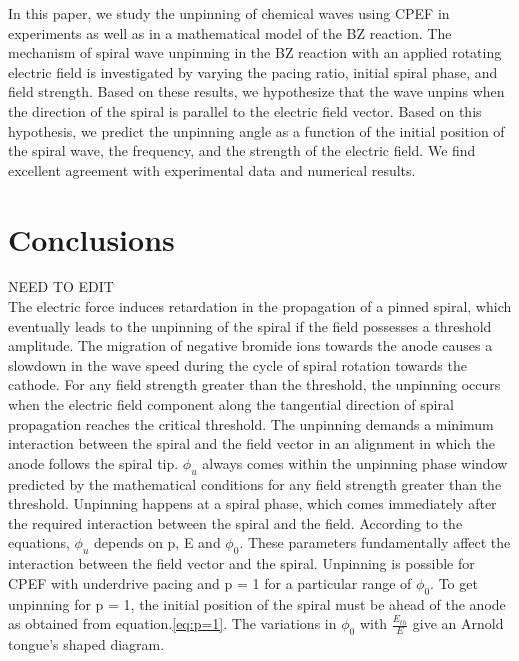 \documentclass[%
 reprint,
 amsmath,amssymb,
 aps,
prb,
]{revtex4-2}
\begin{document}
In this paper, we study the unpinning of chemical waves using CPEF in
experiments as well as in a mathematical model of the BZ reaction. The
mechanism of spiral wave unpinning in the BZ reaction with an applied rotating
electric field is investigated by varying the pacing ratio, initial spiral
phase, and field strength. Based on these results, we hypothesize that the wave
unpins when the direction of the spiral is parallel to the electric field
vector. Based on this hypothesis, we predict the unpinning angle as a function
of the initial position of the spiral wave, the frequency, and the strength of
the electric field. We find excellent agreement with experimental data and
numerical results.  
 


\section{Conclusions}
	NEED TO EDIT\\

The electric force induces retardation in the propagation of a pinned spiral, which eventually leads to the unpinning of the spiral if the field possesses a threshold amplitude. 
The migration of negative bromide ions towards the anode causes a slowdown in the wave speed during the cycle of spiral rotation towards the cathode.
For any field strength greater than the threshold, the unpinning occurs when the electric field component along the tangential direction of spiral propagation reaches the critical threshold.
The unpinning demands a minimum interaction between the spiral and the field vector in an alignment in which the anode follows the spiral tip.
$\phi_u$ always comes within the unpinning phase window predicted by the mathematical conditions for any field strength greater than the threshold. Unpinning happens at a spiral phase, which comes immediately after the required interaction between the spiral and the field.
According to the equations, $\phi_u$ depends on p, E and $\phi_0$. These parameters fundamentally affect the interaction between the field vector and the spiral. 
Unpinning is possible for CPEF with underdrive pacing and p = 1 for a particular range of $\phi_0$. To get unpinning for p = 1, the initial position of the spiral must be ahead of the anode as obtained from equation.\ref{eq:p=1}.  The variations in $\phi_0$ with $\frac{E_{th}}{E}$ give an Arnold tongue's shaped diagram. 
\end{document}
